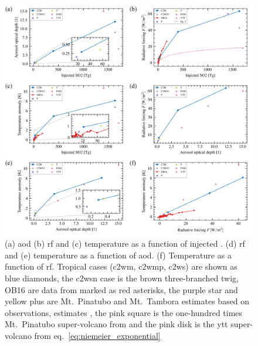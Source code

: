 \documentclass{ametsocV6.1}
\newcommand{\iso}[1][i]{{#1}njected \ce{SO2}}
\begin{document}
\begin{figure}
  \centering
  \includegraphics[width=0.95\linewidth]{figures/parameter_scan.png}

  \caption{(a) \gls{aod} (b) \gls{rf} and (c) temperature as a function of \iso{}\@. (d)
    \gls{rf} and (e) temperature as a function of \gls{aod}. (f) Temperature as a function
    of \gls{rf}. Tropical cases (\gls{c2wm}, \gls{c2wmp}, \gls{c2ws}) are shown as blue
    diamonds, the \gls{c2wsn} case is the brown three-branched twig, OB16 are data from
    \citet{ottobliesner2016} marked as red asterisks, the purple star and yellow plus are
    Mt.\ Pinatubo and Mt.\ Tambora estimates based on observations, estimates , the pink
    square is the one-hundred times Mt.\ Pinatubo super-volcano from \citet{jones2005} and
    the pink disk is the \gls{ytt} super-volcano from
    eq.~\ref{eq:niemeier_exponential}}\label{fig:parameter_scan}%
\end{figure}
\end{document}
